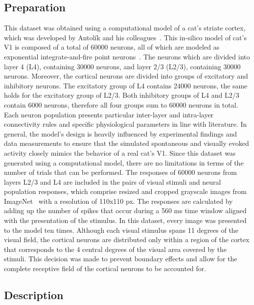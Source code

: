 \subsection{Preparation}
\label{dataset:ten-trials:preparation}
This dataset was obtained using a computational model of a cat's striate cortex, which was developed by Antolík and his colleagues~\citep{antolik2018comprehensive}. This in-silico model of cat's V1 is composed of a total of 60000 neurons, all of which are modeled as exponential integrate-and-fire point neurons~\citep{brette2005adaptive}. The neurons which are divided into layer 4 (L4), containing 30000 neurons, and layer 2/3 (L2/3), containing 30000 neurons. Moreover, the cortical neurons are divided into groups of excitatory and inhibitory neurons. The excitatory group of L4 contains 24000 neurons, the same holds for the excitatory group of L2/3. Both inhibitory groups of L4 and L2/3 contain 6000 neurons, therefore all four groups sum to 60000 neurons in total. Each neuron population presents particular inter-layer and intra-layer connectivity rules and specific physiological parameters in line with literature. In general, the model's design is heavily influenced by experimental findings and data measurements to ensure that the simulated spontaneous and visually evoked activity closely mimics the behavior of a real cat's V1.
Since this dataset was generated using a computational model, there are no limitations in terms of the number of trials that can be performed. The responses of 60000 neurons from layers L2/3 and L4 are included in the pairs of visual stimuli and neural population responses, which comprise resized and cropped grayscale images from ImageNet~\citep{russakovsky2015imagenet} with a resolution of 110x110 px. The responses are calculated by adding up the number of spikes that occur during a 560 ms time window aligned with the presentation of the stimulus. In this dataset, every image was presented to the model ten times.
Although each visual stimulus spans 11 degrees of the visual field, the cortical neurons are distributed only within a region of the cortex that corresponds to the 4 central degrees of the visual area covered by the stimuli. This decision was made to prevent boundary effects and allow for the complete receptive field of the cortical neurons to be accounted for. 


\subsection{Description}
\label{dataset:ten-trials:description}

